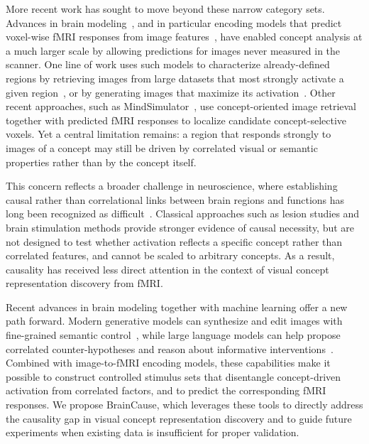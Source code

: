 \documentclass{article}
\begin{document}
More recent work has sought to move beyond these narrow category sets. Advances in brain modeling~\cite{Wasserman2026NoShared, Yamada2015Converter, Scotti2024MindEye2, Beliy2025BrainIT,ratan2021computational}, and in particular encoding models that predict voxel-wise fMRI responses from image features~\cite{Kay08, Naselaris11, Beliy2024Wisdom, adeli2025transformer}, have enabled concept analysis at a much larger scale by allowing predictions for images never measured in the scanner. One line of work uses such models to characterize already-defined regions by retrieving images from large datasets that most strongly activate a given region~\cite{hwang2025silico}, or by generating images that maximize its activation~\cite{neurogen, braindiffusion}. Other recent approaches, such as MindSimulator~\cite{Bao2025MindSimulator}, use concept-oriented image retrieval together with predicted fMRI responses to localize candidate concept-selective voxels. Yet a central limitation remains: a region that responds strongly to images of a concept may still be driven by correlated visual or semantic properties rather than by the concept itself.

This concern reflects a broader challenge in neuroscience, where establishing causal rather than correlational links between brain regions and functions has long been recognized as difficult~\cite{bielczyk2019disentangling, siddiqi2022causal}. Classical approaches such as lesion studies and brain stimulation methods provide stronger evidence of causal necessity, but are not designed to test whether activation reflects a specific concept rather than correlated features, and cannot be scaled to arbitrary concepts. As a result, causality has received less direct attention in the context of visual concept representation discovery from fMRI.

Recent advances in brain modeling together with machine learning offer a new path forward. Modern generative models can synthesize and edit images with fine-grained semantic control~\cite{rombach2022high, brooks2023instructpix2pix, wasserman2025paint, labs2025flux1kontextflowmatching}, while large language models can help propose correlated counter-hypotheses and reason about informative interventions~\cite{kiciman2023causal, alkan2025survey, zhou2024hypothesis}. 
Combined with image-to-fMRI encoding models, these capabilities make it possible to construct controlled stimulus sets that disentangle concept-driven activation from correlated factors, and to predict the corresponding fMRI responses. We propose BrainCause, which leverages these tools to directly address the causality gap in visual concept representation discovery and to guide future experiments when existing data is insufficient for proper validation.
\end{document}
